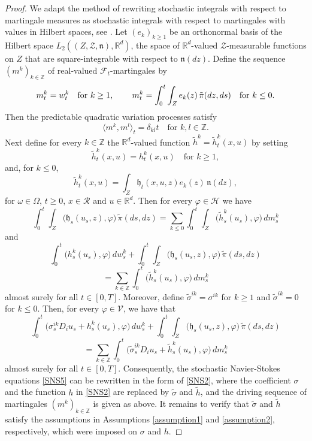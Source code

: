 \documentclass[11pt,reqno]{amsart}
\theoremstyle{definition}
\theoremstyle{remark}
\newcommand\bR{\mathbb{R}}
\newcommand\bZ{\mathbb{Z}}
\newcommand\frh{\mathfrak{h}}
\newcommand\frn{\mathfrak{n}}
\newcommand\cF{\mathcal{F}}
\newcommand\cH{\mathcal{H}}
\newcommand\cR{\mathcal{R}}
\newcommand\cV{\mathcal{V}}
\newcommand\cZ{\mathcal{Z}}
\newcommand{\<}{\langle}
\renewcommand{\>}{\rangle}
\begin{document}
\begin{proof}
We adapt the method of rewriting stochastic integrals 
with respect to martingale measures 
as stochastic integrals with respect to martingales with values 
in Hilbert spaces, see \cite{KG1980}. 
Let $(e_k)_{k\geq 1}$ be an orthonormal basis of the Hilbert space 
$L_2((Z,\cZ,\frn),\bR^d)$, the space of $\bR^d$-valued $\cZ$-measurable functions on $Z$ that are square-integrable with respect to $\frn(dz)$.
Define the sequence $(m^k)_{k\in\bZ}$ of real-valued $\cF_t$-martingales 
by 
$$
m^k_t=w^k_t\quad\text{for $k\geq1$,
\qquad  $m^k_t=\int_0^t\int_{Z}e_k(z)\,\tilde\pi(dz,ds)$\quad for $k\leq0$}. 
$$
Then the predictable quadratic variation processes satisfy 
$$
\langle m^k,m^l\rangle_t=\delta_{kl}t\quad\text{for $k,l\in\bZ$}. 
$$  
Next define for every $k\in\bZ$ the 
$\bR^d$-valued function $\tilde h^k=\tilde h^k_t(x,u)$ by setting 
$$
\tilde h^k_t(x,u)=h^k_t(x,u)\quad\text{for $k\geq1$}, 
$$
and, for $k\leq0$,  
$$
\tilde h^k_t(x,u)= \int_{Z} \frh_t(x, u, z)e_k(z)\,\frn(dz),  
$$
for $\omega\in\Omega$, $t\geq0$, $x\in\cR$ and $u\in\bR^d$. 
Then for every $\varphi\in\cH$ we have 
$$
\int_0^{t}\int_{Z}\big(\frh_s(u_s,z),\varphi\big)\,\tilde\pi(ds,dz)
=\sum_{k\leq0}\int_0^{t}\int_{Z}\big(\tilde h^k_s(u_s),\varphi\big)\,dm^{k}_s  
$$
and 
$$ 
\int_0^t\big(h^k_s(u_s),\varphi\big)\,dw^k_s
+\int_0^{t}\int_{Z}\big(\frh_s(u_s,z),\varphi\big)\,\tilde\pi(ds,dz)
$$
$$
=\sum_{k\in\bZ}\int_0^{t}\big(\tilde h^k_s(u_s),\varphi\big)\,dm^{k}_s
$$
 almost surely for all $t\in[0,T]$.  Moreover, 
 define $\tilde\sigma^{ik}=\sigma^{ik}$ 
 for $k\geq1$ and $\tilde\sigma^{ik}=0$ for $k\leq0$.  
 Then, for every $\varphi\in\cV$,  we have that  
 $$
\int_0^t\big(\sigma^{ik}_s D_iu_s+h^k_s(u_s),\varphi\big)\,dw^k_s
+\int_0^{t}\int_{Z}\big(\frh_s(u_s,z),\varphi\big)\,\tilde\pi(ds,dz)
$$
$$
=\sum_{k\in\bZ}
\int_0^{t}\big(\tilde\sigma^{ik}_sD_iu_s+\tilde h^k_s(u_s),\varphi\big)\,dm^{k}_s
$$
almost surely for all $t\in[0,T]$. Consequently, the stochastic Navier-Stokes equations 
\eqref{SNS5} can be rewritten in the form of \eqref{SNS2}, where 
the coefficient $\sigma$ and the function $h$ in \eqref{SNS2} are 
replaced by $\tilde\sigma$ and $\tilde h$, and the driving sequence of martingales $(m^k)_{k\in\bZ}$ is given as above. 
It remains to verify that $\tilde\sigma$ and $\tilde h$ satisfy the assumptions in Assumptions \ref{assumption1} and \ref{assumption2}, respectively, which were imposed on $\sigma$ and $h$. 



\end{proof}
\end{document}
